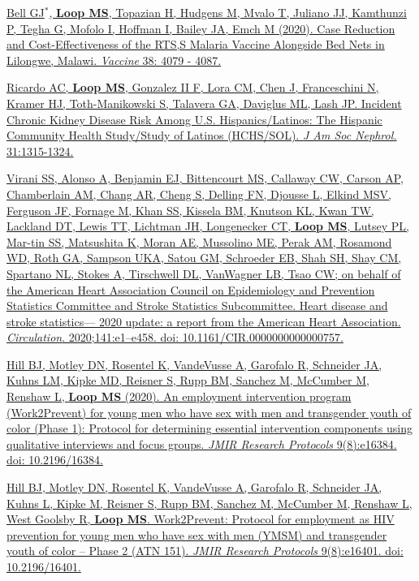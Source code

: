\documentclass[10pt,letterpaper]{article}
\begin{document}
\begin{etaremune}
\item \href{https://www.sciencedirect.com/science/article/pii/S0264410X20305119}{Bell GJ$^*$, \textbf{Loop MS}, Topazian H, Hudgens M, Mvalo T, Juliano JJ, Kamthunzi P, Tegha G, Mofolo I, Hoffman I, Bailey JA, Emch M (2020). Case Reduction and Cost-Effectiveness of the RTS,S Malaria Vaccine Alongside Bed Nets in Lilongwe, Malawi. \emph{Vaccine} 38: 4079 - 4087.}

\item \href{https://jasn.asnjournals.org/content/jnephrol/31/6/1315.full.pdf}{Ricardo AC, \textbf{Loop MS}, Gonzalez II F, Lora CM, Chen J, Franceschini N, Kramer HJ, Toth-Manikowski S, Talavera GA, Daviglus ML, Lash JP. Incident Chronic Kidney Disease Risk Among U.S. Hispanics/Latinos: The Hispanic Community Health Study/Study of Latinos (HCHS/SOL). \emph{J Am Soc Nephrol.} 31:1315-1324.}

\item \href{https://www.ahajournals.org/doi/abs/10.1161/CIR.0000000000000757}{Virani SS, Alonso A, Benjamin EJ, Bittencourt MS, Callaway CW, Carson AP, Chamberlain AM, Chang AR, Cheng S, Delling FN, Djousse L, Elkind MSV, Ferguson JF, Fornage M, Khan SS, Kissela BM, Knutson KL, Kwan TW, Lackland DT, Lewis TT, Lichtman JH, Longenecker CT, \textbf{Loop MS}, Lutsey PL, Mar-tin SS, Matsushita K, Moran AE, Mussolino ME, Perak AM, Rosamond WD, Roth GA, Sampson UKA, Satou GM, Schroeder EB, Shah SH, Shay CM, Spartano NL, Stokes A, Tirschwell DL, VanWagner LB, Tsao CW; on behalf of the American Heart Association Council on Epidemiology and Prevention Statistics Committee and Stroke Statistics Subcommittee. Heart disease and stroke statistics— 2020 update: a report from the American Heart Association. \emph{Circulation}. 2020;141:e1–e458. doi: 10.1161/CIR.0000000000000757.}

\item \href{https://www.researchprotocols.org/2020/8/e16384/}{Hill BJ, Motley DN, Rosentel K, VandeVusse A, Garofalo R, Schneider JA, Kuhns LM, Kipke MD, Reisner S, Rupp BM, Sanchez M, McCumber M, Renshaw L, \textbf{Loop MS} (2020). An employment intervention program (Work2Prevent) for young men who have sex with men and transgender youth of color (Phase 1): Protocol for determining essential intervention components using qualitative interviews and focus groups. \emph{JMIR Research Protocols} 9(8):e16384. doi: 10.2196/16384.}

\item \href{https://www.researchprotocols.org/2020/8/e16401/}{Hill BJ, Motley DN, Rosentel K, VandeVusse A, Garofalo R, Schneider JA, Kuhns L, Kipke M, Reisner S, Rupp BM, Sanchez M, McCumber M, Renshaw L, West Goolsby R, \textbf{Loop MS}. Work2Prevent: Protocol for employment as HIV prevention for young men who have sex with men (YMSM) and transgender youth of color – Phase 2 (ATN 151). \emph{JMIR Research Protocols} 9(8):e16401. doi: 10.2196/16401.}



\end{etaremune}
\end{document}

